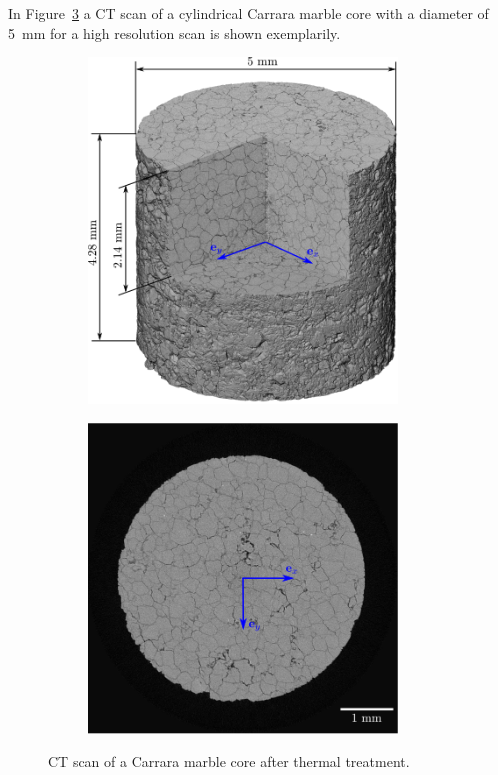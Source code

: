 In Figure~\ref{fig:exampleCarraraMarble} a CT scan of a cylindrical Carrara marble core with a diameter of \SI{5}{\milli\meter} for a high resolution scan is shown exemplarily.
\begin{figure}[ht]
	\centering
    \begin{subfigure}[c]{0.49\textwidth}
    \centering
	\label{fig:exampleCarraraMarble3D}
	\includegraphics[width=0.9\textwidth]{figures/exp_2_2_scan_3d.png}
    \end{subfigure}
    \begin{subfigure}[c]{0.49\textwidth}
    \label{fig:exampleCarraraMarble2D}
	\includegraphics[width=0.9\textwidth]{figures/exp_2_2_scan_2d.png}
\end{subfigure}
\caption{CT scan of a Carrara marble core after thermal treatment.}
\label{fig:exampleCarraraMarble}
\end{figure}
